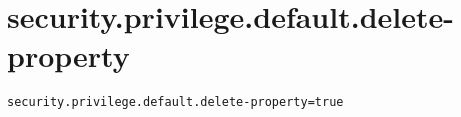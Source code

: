 \section{security.privilege.default.delete-property}
\label{configuration:SecurityPrivilegeDefaultDeleteProperty}
\ClearAPI
\TODO
{}
\begin{lstlisting}[style=Props,caption={Usage example for \textit{security.privilege.default.delete-property}}]
security.privilege.default.delete-property=true
\end{lstlisting}